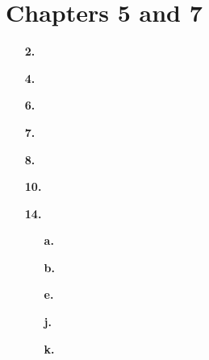 
\section{Chapters 5 and 7}

\begin{enumerate}
	\item[\textbf{2.}]


	\item[\textbf{4.}]


	\item[\textbf{6.}]


	\item[\textbf{7.}]


	\item[\textbf{8.}]


	\item[\textbf{10.}]


	\item[\textbf{14.}]
		\begin{enumerate}
			\item[\textbf{a.}]


			\item[\textbf{b.}]


			\item[\textbf{e.}]


			\item[\textbf{j.}]


			\item[\textbf{k.}]


		\end{enumerate}
\end{enumerate}